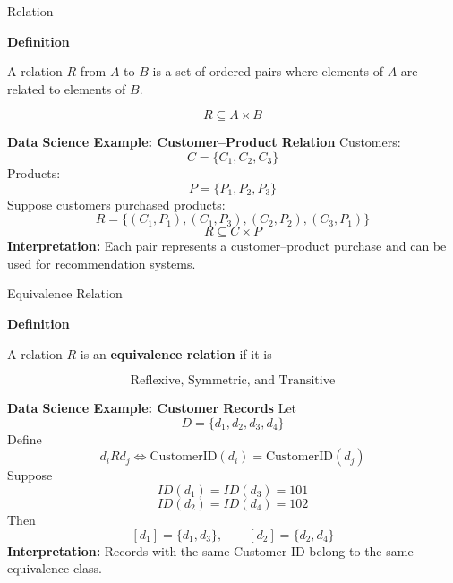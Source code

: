 \documentclass[aspectratio=169]{beamer}
\begin{document}
\begin{frame}{Relation}

\textbf{Definition}

A relation \(R\) from \(A\) to \(B\) is a set of ordered pairs
where elements of \(A\) are related to elements of \(B\).

\[
R\subseteq A\times B
\]

\vspace{0.2cm}

\textbf{Data Science Example: Customer--Product Relation}
Customers:
\[
C=\{C_1,C_2,C_3\}
\]
Products:
\[
P=\{P_1,P_2,P_3\}
\]
Suppose customers purchased products:
\[
R=\{(C_1,P_1),(C_1,P_3),(C_2,P_2),(C_3,P_1)\}
\]
\[
R\subseteq C\times P
\]
\textbf{Interpretation:} Each pair represents a customer--product
purchase and can be used for recommendation systems.

\end{frame}
\begin{frame}{Equivalence Relation}

\textbf{Definition}

A relation \(R\) is an \textbf{equivalence relation} if it is

\[
\boxed{\text{Reflexive, Symmetric, and Transitive}}
\]

\vspace{0.2cm}
\textbf{Data Science Example: Customer Records}
Let
\[
D=\{d_1,d_2,d_3,d_4\}
\]
Define
\[
d_iRd_j
\iff
\text{CustomerID}(d_i)=\text{CustomerID}(d_j)
\]
Suppose
\[
ID(d_1)=ID(d_3)=101
\]
\[
ID(d_2)=ID(d_4)=102
\]
Then
\[
[d_1]=\{d_1,d_3\},
\qquad
[d_2]=\{d_2,d_4\}
\]
\textbf{Interpretation:} Records with the same Customer ID
belong to the same equivalence class.

\end{frame}
\end{document}
